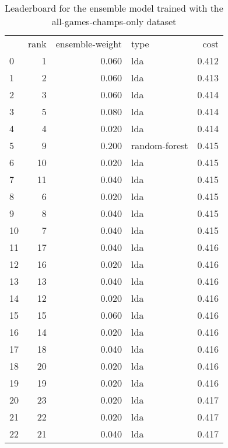 \begin{table}[]
	\centering
	\begin{tabular}{lrrlr}
		   & rank & ensemble-weight & type          & cost  \\
		0  & 1    & 0.060           & lda           & 0.412 \\
		1  & 2    & 0.060           & lda           & 0.413 \\
		2  & 3    & 0.060           & lda           & 0.414 \\
		3  & 5    & 0.080           & lda           & 0.414 \\
		4  & 4    & 0.020           & lda           & 0.414 \\
		5  & 9    & 0.200           & random-forest & 0.415 \\
		6  & 10   & 0.020           & lda           & 0.415 \\
		7  & 11   & 0.040           & lda           & 0.415 \\
		8  & 6    & 0.020           & lda           & 0.415 \\
		9  & 8    & 0.040           & lda           & 0.415 \\
		10 & 7    & 0.040           & lda           & 0.415 \\
		11 & 17   & 0.040           & lda           & 0.416 \\
		12 & 16   & 0.020           & lda           & 0.416 \\
		13 & 13   & 0.040           & lda           & 0.416 \\
		14 & 12   & 0.020           & lda           & 0.416 \\
		15 & 15   & 0.060           & lda           & 0.416 \\
		16 & 14   & 0.020           & lda           & 0.416 \\
		17 & 18   & 0.040           & lda           & 0.416 \\
		18 & 20   & 0.020           & lda           & 0.416 \\
		19 & 19   & 0.020           & lda           & 0.416 \\
		20 & 23   & 0.020           & lda           & 0.417 \\
		21 & 22   & 0.020           & lda           & 0.417 \\
		22 & 21   & 0.040           & lda           & 0.417 \\
	\end{tabular}

	\caption{Leaderboard for the ensemble model trained with the all-games-champs-only dataset}
	\label{tab:lb-all-games-champs-only-PCA}
\end{table}

